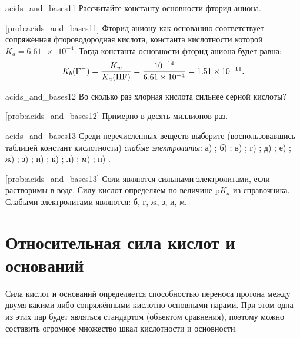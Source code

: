 \begin{problem}{}{acids_and_bases11}
    Рассчитайте константу основности фторид-аниона.
    \begin{sol}{\ref{prob:acids_and_bases11}}
        Фторид-аниону как основанию соответствует сопряжённая фтороводородная кислота, константа кислотности которой $K_a = \num{6,61e-4}$:
        Тогда константа основности фторид-аниона будет равна:
        \begin{equation*}
            K_b(\ce{F^-}) = \frac{K_w}{K_a(\ce{HF})} = \frac{\num{e-14}}{\num{6,61e-4}} = \num{1,51e-11}.
        \end{equation*}
    \end{sol}
\end{problem}

\begin{problem}{}{acids_and_bases12}
    Во сколько раз хлорная кислота сильнее серной кислоты?
    \begin{sol}{\ref{prob:acids_and_bases12}}
        Примерно в десять миллионов раз.
    \end{sol}
\end{problem}

\begin{problem}{}{acids_and_bases13}
    Среди перечисленных веществ выберите (воспользовавшись таблицей констант кислотности) \emph{слабые электролиты}: а) ; б) ; в) ; г) ; д) ; е) ; ж) ; з) ; и) ; к) ; л) ; м) ; н) .
    \begin{sol}{\ref{prob:acids_and_bases13}}
        Соли являются сильными электролитами, если растворимы в воде. Силу кислот определяем по величине $\text{p}K_a$ из справочника. Слабыми электролитами являются: б, г, ж, з, и, м.
    \end{sol}
\end{problem}

\clearpage

\section{Относительная сила кислот и оснований}

Сила кислот и оснований определяется способностью переноса протона между двумя какими-либо сопряжёнными кислотно-основными парами. При этом одна из этих пар будет являться стандартом (объектом сравнения), поэтому можно составить огромное множество шкал кислотности и основности.

